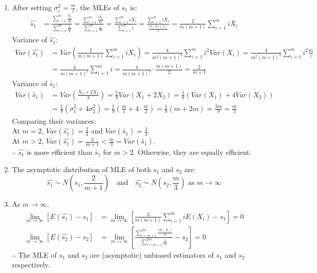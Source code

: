 \documentclass{article}
\begin{document}
\begin{enumerate}
\begin{enumerate}[label=(\roman*)]
    \item After setting $\sigma_i^2 = \frac{m}{i}$, the MLEs of $s_1$ is:
    \begin{align*}
    \hat{s_1} &= \frac{\sum_{i=1}^{m} \frac{X_i}{\frac{m}{i}}}{\sum_{i=1}^{m} \frac{1}{\frac{m}{i}}} = \frac{\sum_{i=1}^{m} \frac{iX_i}{m}}{\sum_{i=1}^{m} \frac{i}{m}} = \frac{\sum_{i=1}^{m} iX_i}{\sum_{i=1}^{m} i} = \frac{\sum_{i=1}^{m} iX_i}{\frac{m(m+1)}{2}} = \frac{2}{m(m+1)} \sum_{i=1}^{m} iX_i
    \end{align*}
    Variance of $\hat{s_1}$:
    \begin{align*}
    Var(\hat{s_1}) &= Var\left( \frac{2}{m(m+1)} \sum_{i=1}^{m} iX_i \right) = \frac{4}{m^2(m+1)^2} \sum_{i=1}^{m} i^2 Var(X_i) = \frac{4}{m^2(m+1)^2} \sum_{i=1}^{m} i^2 \frac{m}{i} \\
    &= \frac{4}{m(m+1)^2} \sum_{i=1}^{m} i = \frac{4}{m(m+1)^2} \cdot \frac{m(m+1)}{2} = \frac{2}{m+1}
    \end{align*}
    Variance of $\tilde{s_1}$:
    \begin{align*}
    Var(\tilde{s_1}) &= Var\left( \frac{X_1 + 2X_2}{3} \right) = \frac{1}{9} Var(X_1 + 2X_2) = \frac{1}{9} (Var(X_1) + 4Var(X_2)) \\
    &= \frac{1}{9} (\sigma_1^2 + 4\sigma_2^2) = \frac{1}{9} \left( \frac{m}{1} + 4 \cdot \frac{m}{2} \right) = \frac{1}{9} \left( m + 2m \right) = \frac{3m}{9} = \frac{m}{3}
    \end{align*}
    Comparing their variances: \\
    At $m=2$, $Var(\hat{s_1}) = \frac{2}{3}$ and $Var(\tilde{s_1}) = \frac{2}{3}$. \\
    At $m>2$, $Var(\hat{s_1}) = \frac{2}{m+1} < \frac{m}{3} = Var(\tilde{s_1})$. \\
    $\therefore$ $\hat{s_1}$ is more efficient than $\tilde{s_1}$ for $m>2$. Otherwise, they are equally efficient. 

    \item
    The asymptotic distribution of MLE of both $s_1$ and $s_2$ are:
    \[
    \hat{s_1} \sim N\left( s_1, \frac{2}{m+1} \right) \quad \text{and} \quad \hat{s_2} \sim N\left( s_2, \frac{m}{3} \right) \text{ as } m \to \infty
    \]

    \item As $m \to \infty$,
    \begin{align*}
    \lim_{m \to \infty} [E(\hat{s_1}) - s_1] &= \lim_{m \to \infty} \left[ \frac{2}{m(m+1)} \sum_{i=1}^{m} iE(X_i) - s_1 \right] = 0 \\
    \lim_{m \to \infty} [E(\hat{s_2}) - s_2] &= \lim_{m \to \infty} \left[ \frac{\sum_{i=m+1}^{2m} \frac{iE(X_i)}{m}}{\sum_{i=m+1}^{2m} \frac{i}{m}} - s_2 \right] = 0
    \end{align*}
    $\therefore$ The MLE of $s_1$ and $s_2$ are (asymptotic) unbiased estimators of $s_1$ and $s_2$ respectively.


\end{enumerate}
\end{enumerate}
\end{document}
